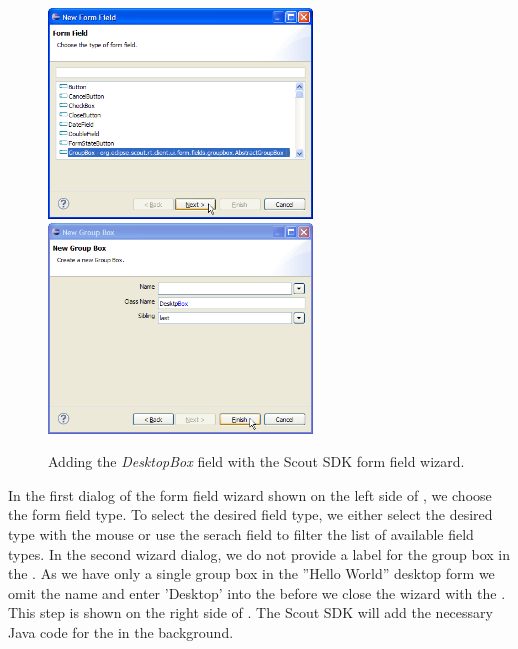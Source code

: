 \documentclass[a4paper,10pt,twoside]{book}
\begin{document}
\begin{figure}
\includegraphics[width=7cm]{sdk_new_field_groupbox_1.png} \hspace{8mm}
\includegraphics[width=7cm]{sdk_new_field_groupbox_2.png}
\caption{Adding the \textit{DesktopBox} field with the Scout SDK form field wizard.}
\end{figure}

In the first dialog of the form field wizard shown on the left side of , we choose the form field type.
To select the desired field type, we either select the desired type with the mouse or use the serach field to filter the list of available field types.
In the second wizard dialog, we do not provide a label for the group box in the .
As we have only a single group box in the ''Hello World'' desktop form we omit the name and enter 'Desktop' into the  before we close the wizard with the .
This step is shown on the right side of .
The Scout SDK will add the necessary Java code for the  in the background.
\end{document}
